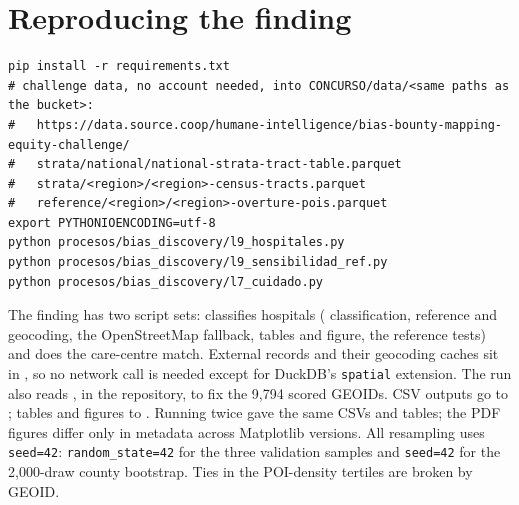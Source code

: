 \documentclass[a4paper]{article}
\begin{document}
\section{Reproducing the finding}

\begin{verbatim}
pip install -r requirements.txt
# challenge data, no account needed, into CONCURSO/data/<same paths as the bucket>:
#   https://data.source.coop/humane-intelligence/bias-bounty-mapping-equity-challenge/
#   strata/national/national-strata-tract-table.parquet
#   strata/<region>/<region>-census-tracts.parquet
#   reference/<region>/<region>-overture-pois.parquet
export PYTHONIOENCODING=utf-8
python procesos/bias_discovery/l9_hospitales.py
python procesos/bias_discovery/l9_sensibilidad_ref.py
python procesos/bias_discovery/l7_cuidado.py
\end{verbatim}

The finding has two script sets:  classifies hospitals
( classification,  reference and geocoding,
 the OpenStreetMap fallback,  tables and figure,
 the reference tests) and 
does the care-centre match. External records and their geocoding caches sit in
, so no network call is needed except for DuckDB's \texttt{spatial}
extension. The run also reads , in the repository,
to fix the 9,794 scored GEOIDs. CSV outputs go to ; tables and figures to
. Running  twice gave the same CSVs and tables;
the PDF figures differ only in metadata across Matplotlib versions. All resampling uses
\texttt{seed=42}: \texttt{random\_state=42} for the three validation samples and \texttt{seed=42} for
the 2,000-draw county bootstrap. Ties in the POI-density tertiles are broken by GEOID.
\end{document}
